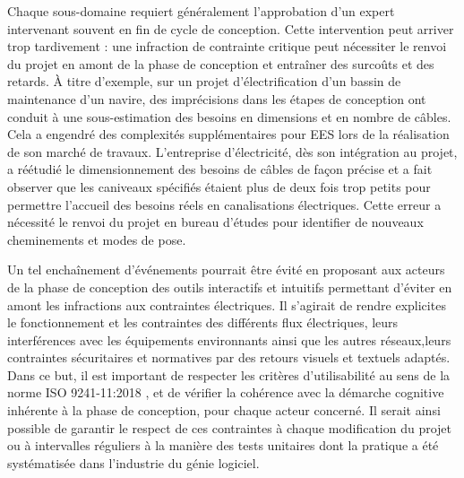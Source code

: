\documentclass[a4paper,12pt]{article}
\begin{document}
Chaque sous-domaine requiert généralement l’approbation d'un expert intervenant souvent en fin de cycle de conception. Cette intervention peut arriver trop tardivement : une infraction de contrainte critique peut nécessiter le renvoi du projet en amont de la phase de conception et entraîner des surcoûts et des retards. À titre d’exemple, sur un projet d’électrification d’un bassin de maintenance d’un navire, des imprécisions dans les étapes de conception ont conduit à une sous-estimation des besoins en dimensions et en nombre de câbles. Cela a engendré des complexités supplémentaires pour EES lors de la réalisation de son marché de travaux. L’entreprise d’électricité, dès son intégration au projet, a réétudié le dimensionnement des besoins de câbles de façon précise et a fait observer que les caniveaux spécifiés étaient plus de deux fois trop petits pour permettre l’accueil des besoins réels en canalisations électriques. Cette erreur a nécessité le renvoi du projet en bureau d’études pour identifier de nouveaux cheminements et modes de pose.

Un tel enchaînement d'événements pourrait être évité en proposant aux acteurs de la phase de conception des outils interactifs et intuitifs permettant d’éviter en amont les infractions aux contraintes électriques. Il s'agirait de rendre explicites le fonctionnement et les contraintes des différents flux électriques, leurs interférences avec les équipements environnants ainsi que les autres réseaux,leurs contraintes sécuritaires et normatives par des retours visuels et textuels adaptés. Dans ce but, il est important de respecter les critères d'utilisabilité au sens de la norme ISO 9241-11:2018 \autocite{ErgonomieLinteractionHommesysteme2018}, et de vérifier la cohérence avec la démarche cognitive inhérente à la phase de conception, pour chaque acteur concerné. Il serait ainsi possible de garantir le respect de ces contraintes à chaque modification du projet ou à intervalles réguliers à la manière des tests unitaires dont la pratique a été systématisée dans l'industrie du génie logiciel.
\end{document}
